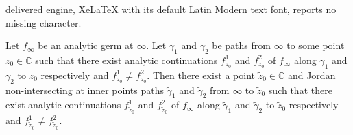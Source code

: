 \documentclass[10pt,a4paper]{amsart}
\def\CC{\mathbb C}
\let\myt\widetilde
\let\myt\widetilde
\begin{document}
delivered engine, XeLaTeX with its default Latin Modern text font, reports no missing character.
\begin{Lemma}
\label{L1}
Let $f_\infty$ be an analytic germ at $\infty$. Let $\gamma_1$ and $\gamma_2$ be paths from $\infty$ to some point $z_0\in\CC$ such that there exist analytic continuations $f_{z_0}^1$ and $f_{z_0}^2$ of $f_\infty$ along $\gamma_1$ and $\gamma_2$ to $z_0$ respectively and $f_{z_0}^1\ne f_{z_0}^2$. Then there exist a point $\myt z_0\in\CC$ and Jordan non-intersecting at inner points paths $\myt\gamma_1$ and $\myt\gamma_2$ from $\infty$ to $\myt z_0$ such that there exist analytic continuations $f_{\myt z_0}^1$ and $f_{\myt z_0}^2$ of $f_\infty$ along $\myt\gamma_1$ and $\myt\gamma_2$ to $\myt z_0$ respectively and $f_{\myt z_0}^1\ne f_{\myt z_0}^2$. 
\end{Lemma}
\end{document}
